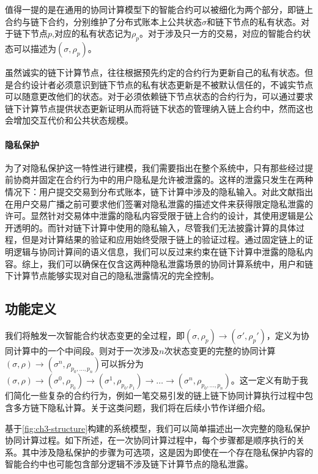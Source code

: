 值得一提的是在通用的协同计算模型下的智能合约可以被细化为两个部分，即链上合约与链下合约，分别维护了分布式账本上公共状态$\sigma$和链下节点的私有状态。对于链下节点$\mathit{p}$,对应的私有状态记为$\rho_\mathit{p}$。对于涉及只一方的交易，对应的智能合约状态可以描述为$(\sigma, \rho_\mathit{p})$。

虽然诚实的链下计算节点，往往根据预先约定的合约行为更新自己的私有状态。但是合约设计者必须意识到链下节点的私有状态更新是不被默认信任的，不诚实节点可以随意更改他们的状态。对于必须依赖链下节点状态的合约行为，可以通过要求链下计算节点提供状态更新证明从而将链下状态的管理纳入链上合约中，然而这也会增加交互代价和公共状态规模\cite{9505181}。

\paragraph{隐私保护}为了对隐私保护这一特性进行建模，我们需要指出在整个系统中，只有那些经过提前协商并固定在合约行为中的用户隐私是允许被泄露的。这样的泄露只发生在两种情况下：用户提交交易到分布式账本，链下计算中涉及的隐私输入。对此文献\cite{9505181}指出在用户交易广播之前可要求他们签署对隐私泄露的描述文件来获得限定隐私泄露的许可。显然针对交易体中泄露的隐私内容受限于链上合约的设计，其使用逻辑是公开透明的。而针对链下计算中使用的隐私输入，尽管我们无法披露计算的具体过程，但是对计算结果的验证和应用始终受限于链上的验证过程。通过固定链上的证明逻辑与协同计算间的语义信息，我们可以反过来约束在链下计算中泄露的隐私内容。综上，我们可以确保在仅含这两种隐私泄露场景的协同计算系统中，用户和链下计算节点能够实现对自己的隐私泄露情况的完全控制。
\subsection{功能定义}
我们将触发一次智能合约状态变更的全过程，即$(\sigma, \rho_\mathit{p})\rightarrow(\sigma', \rho_\mathit{p}')$，定义为协同计算中的一个中间段。则对于一次涉及$n$次状态变更的完整的协同计算$(\sigma, \rho)\rightarrow(\sigma^n, \rho_{p_0,\dots,p_n})$可以拆分为$(\sigma, \rho)\rightarrow(\sigma^0, \rho_{p_0})\rightarrow(\sigma^1, \rho_{p_0,p_1})\rightarrow \dots \rightarrow (\sigma^n, \rho_{p_0,\dots,p_n})$。这一定义有助于我们简化一些复杂的合约行为，例如一笔交易引发的链上链下协同计算执行过程中包含多方链下隐私计算。关于这类问题，我们将在后续小节作详细介绍。

基于\autoref{fig:ch3-structure}构建的系统模型，我们可以简单描述出一次完整的隐私保护协同计算过程。如下所述，在一次协同计算过程中，每个步骤都是顺序执行的关系。其中涉及隐私保护的步骤为可选项，这是因为即使在一个存在隐私保护内容的智能合约中也可能包含部分逻辑不涉及链下计算节点的隐私泄露。

